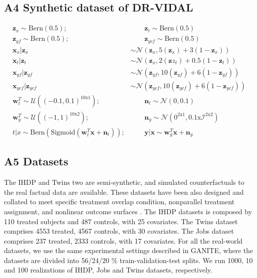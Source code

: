 \documentclass{amia}
\begin{document}
\subsection*{A4 Synthetic dataset of DR-VIDAL} 
\label{GANITE_dataset}
\begin{align}
\textbf{z}_x \sim \text{Bern}(0.5); & \qquad \textbf{z}_t \sim \text{Bern}(0.5) \nonumber\\
\textbf{z}_{yf} \sim \text{Bern}(0.5); & \qquad \textbf{z}_{ycf} \sim \text{Bern}(0.5) \nonumber\\
\textbf{x}_x|\textbf{z}_x &\sim \mathcal{N}(\textbf{z}_x, 5(\textbf{z}_x) + 3(1 - \textbf{z}_x)) \nonumber\\
\textbf{x}_t|\textbf{z}_t &\sim \mathcal{N}(\textbf{z}_x, 2(\textbf{z}z_t) + 0.5(1 - \textbf{z}_t)) \nonumber\\
\textbf{x}_{yf}|\textbf{z}_{yf} &\sim \mathcal{N}(\textbf{z}_{yf}, 10(\textbf{z}_{yf}) + 6(1 - \textbf{z}_{yf})) \nonumber\\
\textbf{x}_{ycf}|\textbf{z}_{ycf} &\sim \mathcal{N}(\textbf{z}_{ycf}, 10(\textbf{z}_{ycf}) + 6(1 - \textbf{z}_{ycf})) \nonumber\\
\textbf{w}_t^T \sim \mathcal{U}((-0.1, 0.1)^{10 \text{x} 1}); & \qquad
\textbf{n}_t \sim \mathcal{N}(0, 0.1)\nonumber\\
\textbf{w}_y^T \sim \mathcal{U}((-1, 1)^{10 \text{x} 2}); & \qquad 
\textbf{n}_y \sim \mathcal{N}(0^{2 \text{x} 1}, 0.1 \text{x} \mathcal{I}^{2 \text{x} 2})\nonumber\\
t|x \sim \text{Bern}(\text{Sigmoid}(\textbf{w}_t^T\textbf{x} + \textbf{n}_t)); & \qquad
\textbf{y}|\textbf{x} \sim \textbf{w}_y^T\textbf{x} + \textbf{n}_y
\label{equ: DR_VIDAL_data}
\end{align}

\subsection*{A5 Datasets}
\label{A-Datasets}
The IHDP and Twins two are semi-synthetic, and simulated counterfactuals to the real factual data are available. These datasets have been also designed and collated to meet specific treatment overlap condition, nonparallel treatment assignment, and nonlinear outcome surfaces \cite{hill2011bayesian, pmlr-v70-shalit17a, louizos2017causal, Yoon2018}. The IHDP datasets is composed by 110 treated subjects and 487 controls, with 25 covariates. The Twins dataset comprises 4553 treated, 4567 controls, with 30 covariates. The Jobs dataset comprises 237 treated, 2333 controls, with 17 covariates. For all the real-world datasets, we use the same experimental settings described in GANITE, where the datasets are divided into 56/24/20 \% train-validation-test splits. We run 1000, 10 and 100 realizations of IHDP, Jobs and Twins datasets, respectively. 
\end{document}
